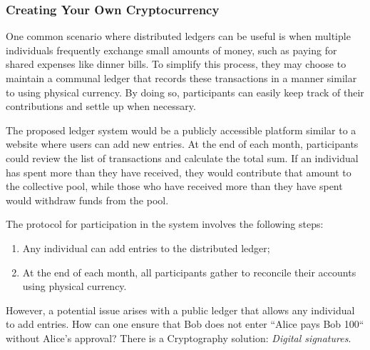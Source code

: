 \subsubsection{Creating Your Own Cryptocurrency}
One common scenario where distributed ledgers can be useful is when multiple individuals frequently exchange small amounts
of money, such as paying for shared expenses like dinner bills. To simplify this process, they may choose to maintain a
communal ledger that records these transactions in a manner similar to using physical currency. By doing so, participants
can easily keep track of their contributions and settle up when necessary.

%

The proposed ledger system would be a publicly accessible platform similar to a website where users can add new entries.
At the end of each month, participants could review the list of transactions and calculate the total sum. If an individual
has spent more than they have received, they would contribute that amount to the collective pool, while those who have
received more than they have spent would withdraw funds from the pool.

The protocol for participation in the system involves the following steps:

\begin{enumerate}
    \item Any individual can add entries to the distributed ledger;
    \item At the end of each month, all participants gather to reconcile their accounts using physical currency.
\end{enumerate}

However, a potential issue arises with a public ledger that allows any individual to add entries. How can one ensure that
Bob does not enter ``Alice pays Bob 100`` without Alice's approval? There is a Cryptography solution: \emph{Digital signatures}.
